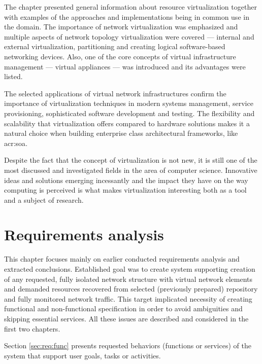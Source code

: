 \documentclass[11pt,openany]{book}
\begin{document}
      The chapter presented general information about resource virtualization together with examples of the approaches and
      implementations being in common use in the domain. The importance of network virtualization was emphasized and
      multiple aspects of network topology virtualization were covered --- internal and external virtualization,
      partitioning and creating logical software-based networking devices. Also, one of the core concepts of virtual
      infrastructure management --- virtual appliances --- was introduced and its advantages were listed.

      The selected applications of virtual network infrastructures confirm the importance of virtualization techniques
      in modern systems management, service provisioning, sophisticated software development and testing. The
      flexibility and scalability that virtualization offers compared to hardware solutions makes it a natural choice when
      building enterprise class architectural frameworks, like \gls{acr:soa}.

      Despite the fact that the concept of virtualization is not new, it is still one of the most discussed and
      investigated fields in the area of computer science. Innovative ideas and solutions emerging incessantly and the
      impact they have on the way computing is perceived is what makes virtualization interesting both as a tool and
      a subject of research.


  \chapter{Requirements analysis}
  \label{chap:req}

    This chapter focuses mainly on earlier conducted requirements analysis and extracted conclusions. Established goal
    was to create system supporting creation of any requested, fully isolated network structure with virtual network
    elements and demanded resources recovered from selected (previously prepared) repository and fully monitored network
    traffic. This target implicated necessity of creating functional and non-functional specification in order to avoid
    ambiguities and skipping essential services. All these issues are described and considered in the first two
    chapters.

    Section \ref{sec:req:func} presents requested behaviors (functions or services) of the system that support user
    goals, tasks or activities.
\end{document}
